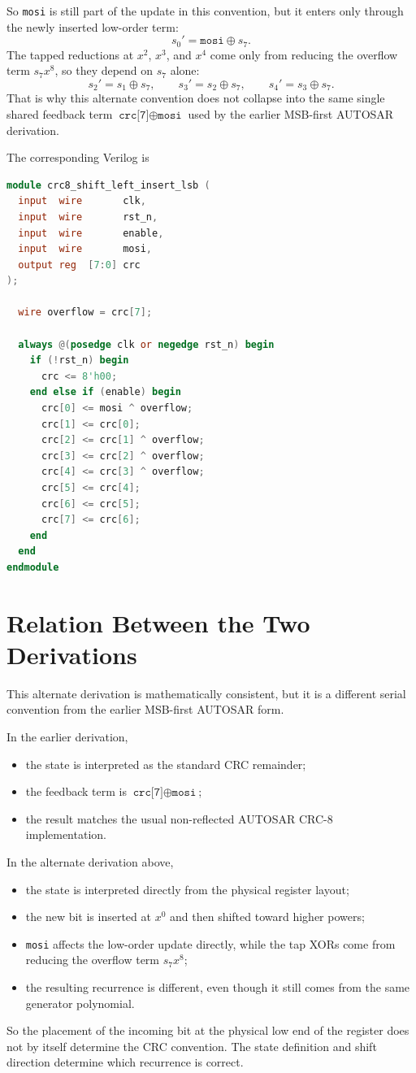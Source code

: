 \documentclass[11pt]{article}
\begin{document}
So \texttt{mosi} is still part of the update in this convention, but it enters only
through the newly inserted low-order term:
\[
s_0' = \texttt{mosi} \oplus s_7.
\]
The tapped reductions at $x^2$, $x^3$, and $x^4$ come only from reducing the
overflow term $s_7 x^8$, so they depend on $s_7$ alone:
\[
s_2' = s_1 \oplus s_7,\qquad
s_3' = s_2 \oplus s_7,\qquad
s_4' = s_3 \oplus s_7.
\]
That is why this alternate convention does not collapse into the same single
shared feedback term $\texttt{crc[7]} \oplus \texttt{mosi}$ used by the earlier
MSB-first AUTOSAR derivation.

The corresponding Verilog is
\begin{lstlisting}[language=Verilog]
module crc8_shift_left_insert_lsb (
  input  wire       clk,
  input  wire       rst_n,
  input  wire       enable,
  input  wire       mosi,
  output reg  [7:0] crc
);

  wire overflow = crc[7];

  always @(posedge clk or negedge rst_n) begin
    if (!rst_n) begin
      crc <= 8'h00;
    end else if (enable) begin
      crc[0] <= mosi ^ overflow;
      crc[1] <= crc[0];
      crc[2] <= crc[1] ^ overflow;
      crc[3] <= crc[2] ^ overflow;
      crc[4] <= crc[3] ^ overflow;
      crc[5] <= crc[4];
      crc[6] <= crc[5];
      crc[7] <= crc[6];
    end
  end
endmodule
\end{lstlisting}

\section{Relation Between the Two Derivations}

This alternate derivation is mathematically consistent, but it is a different
serial convention from the earlier MSB-first AUTOSAR form.

In the earlier derivation,
\begin{itemize}
\item the state is interpreted as the standard CRC remainder;
\item the feedback term is $\texttt{crc[7]} \oplus \texttt{mosi}$;
\item the result matches the usual non-reflected AUTOSAR CRC-8 implementation.
\end{itemize}

In the alternate derivation above,
\begin{itemize}
\item the state is interpreted directly from the physical register layout;
\item the new bit is inserted at $x^0$ and then shifted toward higher powers;
\item \texttt{mosi} affects the low-order update directly, while the tap XORs come
from reducing the overflow term $s_7 x^8$;
\item the resulting recurrence is different, even though it still comes from the
same generator polynomial.
\end{itemize}

So the placement of the incoming bit at the physical low end of the register does
not by itself determine the CRC convention. The state definition and shift
direction determine which recurrence is correct.
\end{document}
